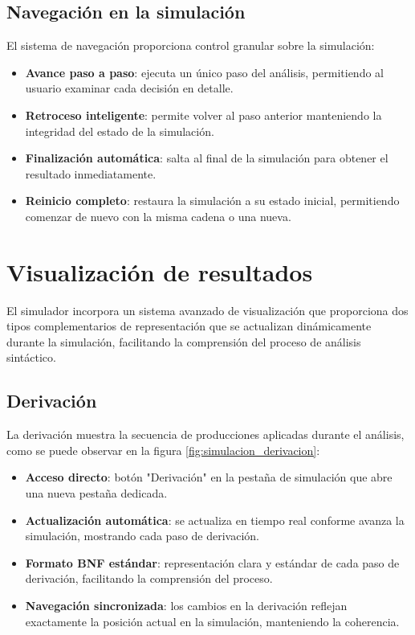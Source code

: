 \subsection{Navegación en la simulación}

El sistema de navegación proporciona control granular sobre la simulación:

\begin{itemize}
    \item \textbf{Avance paso a paso}: ejecuta un único paso del análisis, permitiendo al usuario examinar cada decisión en detalle.
    \item \textbf{Retroceso inteligente}: permite volver al paso anterior manteniendo la integridad del estado de la simulación.
    \item \textbf{Finalización automática}: salta al final de la simulación para obtener el resultado inmediatamente.
    \item \textbf{Reinicio completo}: restaura la simulación a su estado inicial, permitiendo comenzar de nuevo con la misma cadena o una nueva.
\end{itemize}

\section{Visualización de resultados}

El simulador incorpora un sistema avanzado de visualización que proporciona dos tipos complementarios de representación que se actualizan dinámicamente durante la simulación, facilitando la comprensión del proceso de análisis sintáctico.

\subsection{Derivación}

La derivación muestra la secuencia de producciones aplicadas durante el análisis, como se puede observar en la figura \ref{fig:simulacion_derivacion}:

\begin{itemize}
    \item \textbf{Acceso directo}: botón \string"Derivación\string" en la pestaña de simulación que abre una nueva pestaña dedicada.
    \item \textbf{Actualización automática}: se actualiza en tiempo real conforme avanza la simulación, mostrando cada paso de derivación.
    \item \textbf{Formato BNF estándar}: representación clara y estándar de cada paso de derivación, facilitando la comprensión del proceso.
    \item \textbf{Navegación sincronizada}: los cambios en la derivación reflejan exactamente la posición actual en la simulación, manteniendo la coherencia.
\end{itemize}

